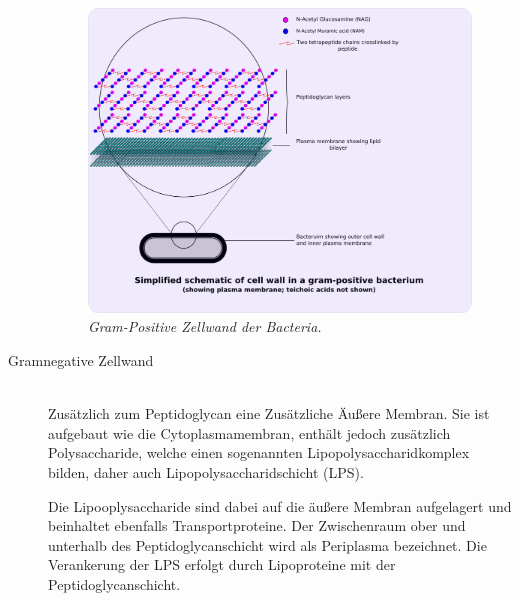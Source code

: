 \begin{description}
		\begin{figure}[ht!]
			\leavevmode
			\begin{center}
				\includegraphics[scale=0.27]{./pictures/gram_positive_zw}
			\end{center}
			\caption{\slshape{Gram-Positive Zellwand der Bacteria.}}
			\label{fig:gramPosBacZW}
		\end{figure}

	\item[Gramnegative Zellwand] \hfill \\
		Zusätzlich zum Peptidoglycan eine Zusätzliche Äußere Membran.
		Sie ist aufgebaut wie die Cytoplasmamembran,
		enthält jedoch zusätzlich Polysaccharide,
		welche einen sogenannten Lipopolysaccharidkomplex bilden,
		daher auch Lipopolysaccharidschicht (LPS).

		Die Lipooplysaccharide sind dabei auf die äußere Membran aufgelagert
		und beinhaltet ebenfalls Transportproteine.
		Der Zwischenraum ober und unterhalb des Peptidoglycanschicht 
		wird als Periplasma bezeichnet.
		Die Verankerung der LPS erfolgt durch Lipoproteine mit der Peptidoglycanschicht.


\end{description}
